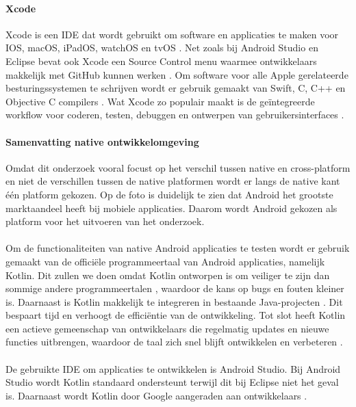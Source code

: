 \paragraph{Xcode}
Xcode is een IDE dat wordt gebruikt om software en applicaties te maken voor IOS, macOS, 
iPadOS, watchOS en tvOS \autocite{jahnavisarora2020}. Net zoals bij Android Studio en 
Eclipse bevat ook Xcode een Source Control menu waarmee ontwikkelaars makkelijk met GitHub 
kunnen werken \autocite{Medewar2022}. Om software voor alle Apple gerelateerde besturingssystemen 
te schrijven wordt er gebruik gemaakt van Swift, C, C++ en Objective C compilers 
\autocite{jahnavisarora2020}. Wat Xcode zo populair maakt is de geïntegreerde workflow 
voor coderen, testen, debuggen en ontwerpen van gebruikersinterfaces \autocite{jahnavisarora2020}.

\paragraph{Samenvatting native ontwikkelomgeving}
Omdat dit onderzoek vooral focust op het verschil tussen native en cross-platform en niet 
de verschillen tussen de native platformen wordt er langs de native kant één platform gekozen.
Op de foto is duidelijk te zien dat Android het grootste marktaandeel heeft bij mobiele 
applicaties. Daarom wordt Android gekozen als platform voor het uitvoeren van het onderzoek.
\\\\
Om de functionaliteiten van native Android applicaties 
te testen wordt er gebruik gemaakt van de officiële programmeertaal van Android applicaties, 
namelijk Kotlin. Dit zullen we doen omdat Kotlin ontworpen is om veiliger te zijn dan 
sommige andere programmeertalen \autocite{Kesavan2021}, waardoor de kans op bugs en 
fouten kleiner is. Daarnaast is Kotlin makkelijk te integreren in bestaande 
Java-projecten \autocite{Kesavan2021}. Dit bespaart tijd en verhoogt de efficiëntie 
van de ontwikkeling. Tot slot heeft Kotlin een actieve gemeenschap van ontwikkelaars 
die regelmatig updates en nieuwe functies uitbrengen, waardoor de taal zich snel blijft 
ontwikkelen en verbeteren \autocite{Patel2023}.
\\\\
De gebruikte IDE om applicaties te ontwikkelen is Android Studio. Bij Android Studio wordt 
Kotlin standaard ondersteunt terwijl dit bij Eclipse niet het geval is. Daarnaast wordt Kotlin 
door Google aangeraden aan ontwikkelaars \autocite{Medewar2022}.


